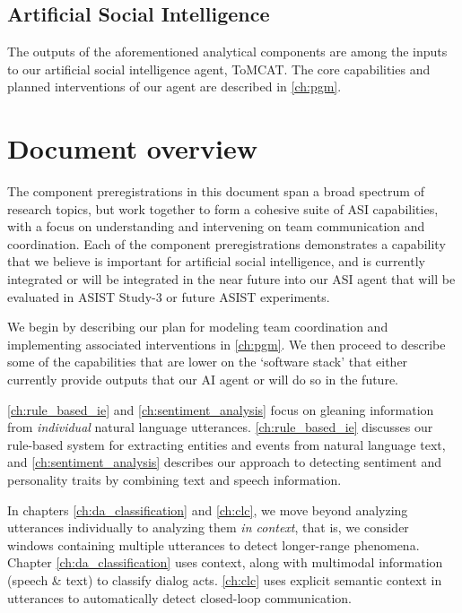 \subsection{Artificial Social Intelligence}

The outputs of the aforementioned analytical components are among the inputs to
our artificial social intelligence agent, ToMCAT. The core capabilities and
planned interventions of our agent are described in \autoref{ch:pgm}.

\section{Document overview}


The component preregistrations in this document span a broad spectrum of
research topics, but work together to form a cohesive suite of ASI
capabilities, with a focus on understanding and intervening on team
communication and coordination.
Each of the component preregistrations demonstrates a capability that we
believe is important for artificial social intelligence, and is currently
integrated or will be integrated in the near future into our ASI agent that
will be evaluated in ASIST Study-3 or future ASIST experiments.

We begin by describing our plan for modeling team coordination and implementing
associated interventions in \autoref{ch:pgm}.  We then proceed to describe some
of the capabilities that are lower on the `software stack' that either
currently provide outputs that our AI agent or will do so in the future.

\autoref{ch:rule_based_ie} and \autoref{ch:sentiment_analysis} focus on
gleaning information from \emph{individual} natural language utterances.
\autoref{ch:rule_based_ie} discusses our rule-based system for extracting
entities and events from natural language text, and
\autoref{ch:sentiment_analysis} describes our approach to detecting sentiment
and personality traits by combining text and speech information.

In chapters \autoref{ch:da_classification} and \autoref{ch:clc}, we move beyond
analyzing utterances individually to analyzing them \emph{in context}, that is,
we consider windows containing multiple utterances to detect longer-range
phenomena. Chapter \autoref{ch:da_classification} uses context, along with
multimodal information (speech \& text) to classify dialog acts.
\autoref{ch:clc} uses explicit semantic context in utterances to automatically
detect closed-loop communication.

